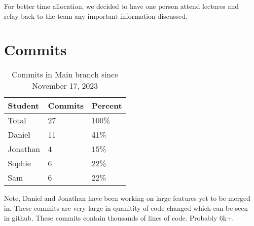 \documentclass{article}
\begin{document}
For better time allocation, we decided to have one person attend lectures and relay back to the team any important information discussed.

\section{Commits}

\begin{table}[H]
\centering
\begin{tabular}{lll}
\toprule
\textbf{Student} & \textbf{Commits} & \textbf{Percent}\\
\midrule
Total & 27 & 100\% \\
Daniel & 11 & 41\% \\
Jonathan & 4 & 15\% \\
Sophie & 6 & 22\% \\
Sam & 6 & 22\% \\
\bottomrule
\end{tabular}
\caption{Commits in Main branch since November 17, 2023}
\end{table}

Note, Daniel and Jonathan have been working on large features yet to be merged in. These commits are very large in quanitity of code changed which can be seen in github. These commits contain thousands of lines of code. Probably 6k+.
\end{document}
